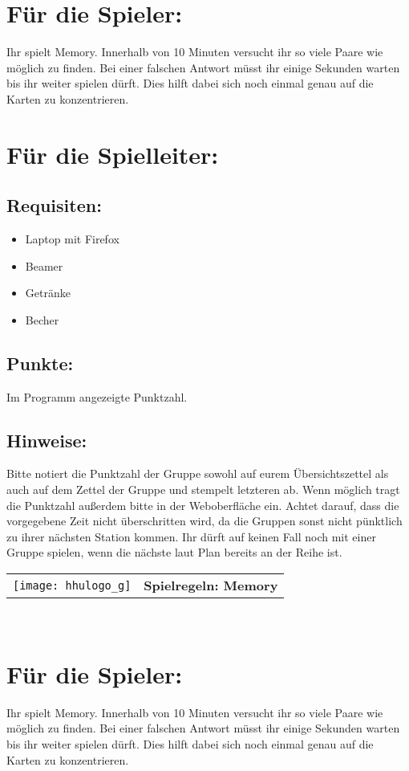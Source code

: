 \documentclass[a4paper,10pt]{article}
\def\spielg{Memory}
\newcommand{\unten}{
 Bitte notiert die Punktzahl der Gruppe sowohl auf eurem Übersichtszettel als auch auf dem Zettel der Gruppe und stempelt letzteren ab. Wenn möglich tragt die Punktzahl außerdem bitte in der Weboberfläche ein.
 Achtet darauf, dass die vorgegebene Zeit nicht überschritten wird, da die Gruppen sonst nicht pünktlich zu ihrer nächsten Station kommen. Ihr dürft auf keinen Fall noch mit einer Gruppe spielen, wenn die nächste laut Plan bereits an der Reihe ist.
}
\begin{document}
\Large
\section*{Für die Spieler:}
Ihr spielt Memory. Innerhalb von 10 Minuten versucht ihr so viele Paare wie möglich zu finden. Bei einer falschen Antwort müsst ihr einige Sekunden warten bis ihr weiter spielen dürft. Dies hilft dabei sich noch einmal genau auf die Karten zu konzentrieren.

\section*{Für die Spielleiter:}
\subsection*{Requisiten:} 
\begin{itemize}
 \item Laptop mit Firefox
 \item Beamer
 \item Getränke
 \item Becher
\end{itemize}
\subsection*{Punkte:}
Im Programm angezeigte Punktzahl.

\subsection*{Hinweise:}
\unten

\newpage


  \begin{tabularx}{\textwidth}{lc}
    \texttt{[image: hhulogo\_g]}
  & {\Huge \textbf{Spielregeln: \spielg}}
  \end{tabularx}\\

\Large
\section*{Für die Spieler:}
Ihr spielt Memory. Innerhalb von 10 Minuten versucht ihr so viele Paare wie möglich zu finden. Bei einer falschen Antwort müsst ihr einige Sekunden warten bis ihr weiter spielen dürft. Dies hilft dabei sich noch einmal genau auf die Karten zu konzentrieren.
\end{document}
